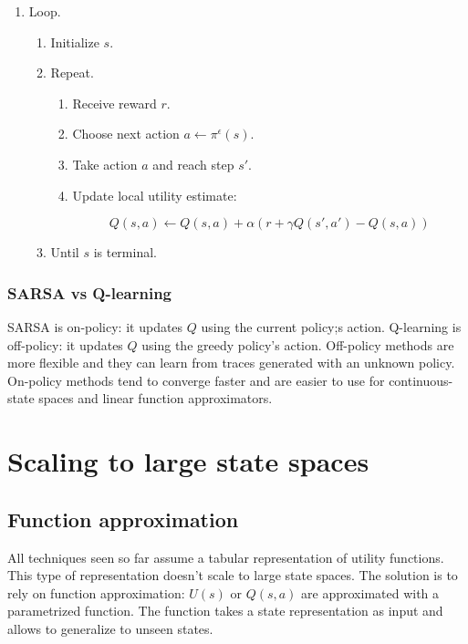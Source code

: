 		\begin{enumerate}
			\item Loop.

				\begin{enumerate}
					\item Initialize $s$.
					\item Repeat.

						\begin{enumerate}
							\item Receive reward $r$.
							\item Choose next action $a\leftarrow\pi^\epsilon(s)$.
							\item Take action $a$ and reach step $s'$.
							\item Update local utility estimate:

								$$Q(s,a) \leftarrow Q(s,a) + \alpha(r+\gamma Q(s',a')- Q(s,a))$$

						\end{enumerate}

					\item Until $s$ is terminal.
				\end{enumerate}

		\end{enumerate}
	
		\subsubsection{SARSA vs Q-learning}
		SARSA is on-policy: it updates $Q$ using the current policy;s action.
		Q-learning is off-policy: it updates $Q$ using the greedy policy's action.
		Off-policy methods are more flexible and they can learn from traces generated with an unknown policy.
		On-policy methods tend to converge faster and are easier to use for continuous-state spaces and linear function approximators.

\section{Scaling to large state spaces}

	\subsection{Function approximation}
	All techniques seen so far assume a tabular representation of utility functions.
	This type of representation doesn't scale to large state spaces.
	The solution is to rely on function approximation: $U(s)$ or $Q(s,a)$ are approximated with a parametrized function.
	The function takes a state representation as input and allows to generalize to unseen states.

